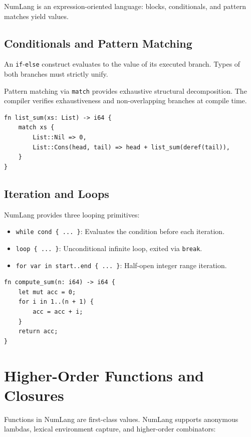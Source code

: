NumLang is an expression-oriented language: blocks, conditionals, and pattern matches yield values.

\subsection{Conditionals and Pattern Matching}
An \texttt{if}-\texttt{else} construct evaluates to the value of its executed branch. Types of both branches must strictly unify.

Pattern matching via \texttt{match} provides exhaustive structural decomposition. The compiler verifies exhaustiveness and non-overlapping branches at compile time.

\begin{lstlisting}[language=NumLang, caption={Pattern Matching with Deep Algebraic Decomposition.}]
fn list_sum(xs: List) -> i64 {
    match xs {
        List::Nil => 0,
        List::Cons(head, tail) => head + list_sum(deref(tail)),
    }
}
\end{lstlisting}

\subsection{Iteration and Loops}
NumLang provides three looping primitives:
\begin{itemize}
    \item \texttt{while cond \{ ... \}}: Evaluates the condition before each iteration.
    \item \texttt{loop \{ ... \}}: Unconditional infinite loop, exited via \texttt{break}.
    \item \texttt{for var in start..end \{ ... \}}: Half-open integer range iteration.
\end{itemize}

\begin{lstlisting}[language=NumLang, caption={Loop Constructs in NumLang.}]
fn compute_sum(n: i64) -> i64 {
    let mut acc = 0;
    for i in 1..(n + 1) {
        acc = acc + i;
    }
    return acc;
}
\end{lstlisting}

\section{Higher-Order Functions and Closures}
\label{sec:lang:closures}

Functions in NumLang are first-class values. NumLang supports anonymous lambdas, lexical environment capture, and higher-order combinators:

